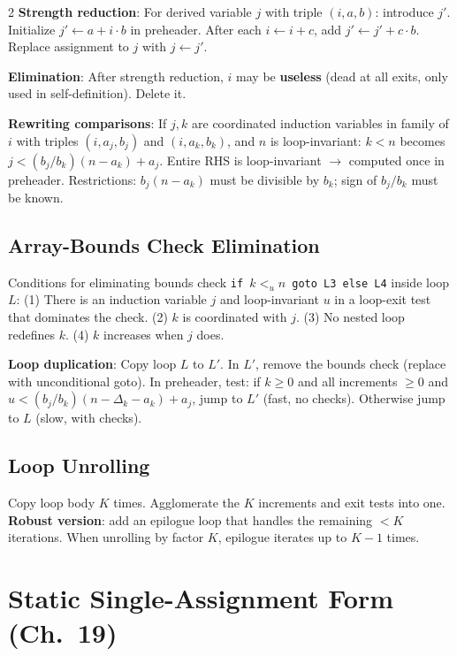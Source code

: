 \documentclass[9pt,landscape]{extarticle}
\begin{document}
\begin{multicols}{2}
\textbf{Strength reduction}: For derived variable $j$ with triple $(i, a, b)$: introduce $j'$. Initialize $j' \leftarrow a + i \cdot b$ in preheader. After each $i \leftarrow i + c$, add $j' \leftarrow j' + c \cdot b$. Replace assignment to $j$ with $j \leftarrow j'$.

\textbf{Elimination}: After strength reduction, $i$ may be \textbf{useless} (dead at all exits, only used in self-definition). Delete it.

\textbf{Rewriting comparisons}: If $j, k$ are coordinated induction variables in family of $i$ with triples $(i, a_j, b_j)$ and $(i, a_k, b_k)$, and $n$ is loop-invariant: $k < n$ becomes $j < (b_j/b_k)(n - a_k) + a_j$. Entire RHS is loop-invariant $\to$ computed once in preheader. Restrictions: $b_j(n - a_k)$ must be divisible by $b_k$; sign of $b_j/b_k$ must be known.

\subsection{Array-Bounds Check Elimination}

Conditions for eliminating bounds check \texttt{if $k <_u n$ goto L3 else L4} inside loop $L$: (1) There is an induction variable $j$ and loop-invariant $u$ in a loop-exit test that dominates the check. (2) $k$ is coordinated with $j$. (3) No nested loop redefines $k$. (4) $k$ increases when $j$ does.

\textbf{Loop duplication}: Copy loop $L$ to $L'$. In $L'$, remove the bounds check (replace with unconditional goto). In preheader, test: if $k \geq 0$ and all increments $\geq 0$ and $u < (b_j/b_k)(n - \Delta_k - a_k) + a_j$, jump to $L'$ (fast, no checks). Otherwise jump to $L$ (slow, with checks).

\subsection{Loop Unrolling}

Copy loop body $K$ times. Agglomerate the $K$ increments and exit tests into one. \textbf{Robust version}: add an epilogue loop that handles the remaining $< K$ iterations. When unrolling by factor $K$, epilogue iterates up to $K - 1$ times.

\section{Static Single-Assignment Form (Ch.~19)}


\end{multicols}
\end{document}
